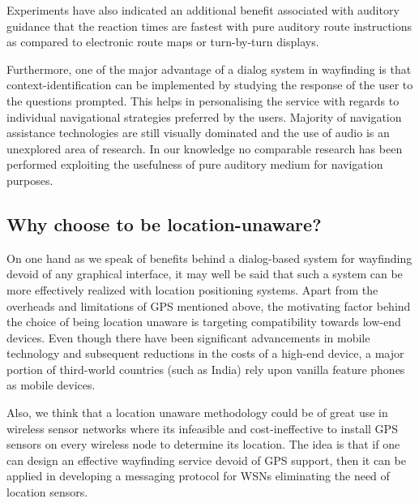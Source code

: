 \documentclass{iitkthesis}
\begin{document}
Experiments \cite{srinivasaneffect} have also indicated an additional benefit associated with auditory guidance that the reaction times are fastest with pure auditory route instructions as compared to electronic route maps or turn-by-turn displays. 

Furthermore,  one of the major advantage of a dialog system in wayfinding is that context-identification can be implemented by studying the response of the user to the questions prompted. This helps in personalising the service with regards to individual navigational strategies preferred by the users. Majority of navigation assistance technologies are still visually dominated and the use of audio is an unexplored area of research. In our knowledge no comparable research has been performed exploiting the usefulness of pure auditory medium for navigation purposes.
\subsection{Why choose to be location-unaware?}
On one hand as we speak of benefits behind a dialog-based system for wayfinding devoid of any graphical interface, it may well be said that such a system can be more effectively realized with location positioning systems. Apart from the overheads and limitations of GPS mentioned above, the motivating factor behind the choice of being location unaware is targeting compatibility towards low-end devices. Even though there have been significant advancements in mobile technology and subsequent reductions in the costs of a high-end device, a major portion of third-world countries (such as India) rely upon vanilla feature phones as mobile devices. 

Also,  we think that a location unaware methodology could be of great use in wireless sensor networks where its infeasible and cost-ineffective to install GPS sensors on every wireless node to determine its location. The idea is that if one can design an effective wayfinding service devoid of GPS support, then it can be applied in developing a messaging protocol for WSNs eliminating the need of location sensors. 
\end{document}
